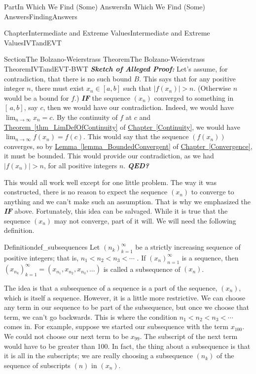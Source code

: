 \documentclass[oneside,10pt,]{book}
\newcommand{\xreffont}{\relax}
\newcommand{\alert}[1]{\textbf{\textit{#1}}}
\numberwithin{equation}{part}
\newcommand{\abs}[1]{\left|#1\right|}
\newcommand{\lt}{<}
\begin{document}
\begin{partptx}{Part}{In Which We Find (Some) Answers}{}{In Which We Find (Some) Answers}{}{}{FindingAnswers}
\begin{chapterptx}{Chapter}{Intermediate and Extreme Values}{}{Intermediate and Extreme Values}{}{}{IVTandEVT}
\begin{sectionptx}{Section}{The Bolzano-Weierstrass Theorem}{}{The Bolzano-Weierstrass Theorem}{}{}{IVTandEVT-BWT}
\alert{Sketch of Alleged Proof:} Let's assume, for contradiction, that there is no such bound \(B\). This says that for any positive integer \(n\), there must exist \(x_n\in[a,b]\) such that \(\abs{f(x_n)}>n\). (Otherwise \(n\) would be a bound for \(f\).) \alert{IF} the sequence \(\left(x_n\right)\) converged to something in \([\,a,b]\), say \(c\), then we would have our contradiction. Indeed, we would have \(\lim_{n\rightarrow\infty}x_n=c\). By the continuity of \(f\) at \(c\) and \hyperref[thm_LimDefOfContinuity]{Theorem~{\xreffont\ref{thm_LimDefOfContinuity}}} of \hyperref[Continuity]{Chapter~{\xreffont\ref{Continuity}}}, we would have \(\lim_{n\rightarrow\infty}f(x_n)=f(c)\). This would say that the sequence \(\left(f(x_n)\right)\) converges, so by \hyperref[lemma_BoundedConvergent]{Lemma~{\xreffont\ref{lemma_BoundedConvergent}}} of \hyperref[Convergence]{Chapter~{\xreffont\ref{Convergence}}}, it must be bounded. This would provide our contradiction, as we had \(|f(x_n)|>n\), for all positive integers \(n\). \alert{QED?}%
\par
This would all work well except for one little problem. The way it was constructed, there is no reason to expect the sequence \(\left(x_n\right)\) to converge to anything and we can't make such an assumption. That is why we emphasized the \alert{IF} above. Fortunately, this idea can be salvaged. While it is true that the sequence \(\left(x_n\right)\) may not converge, part of it will. We will need the following definition.%
\begin{definition}{Definition}{}{def_subsequences}%
 Let \(\left(n_k\right)_{k=1}^\infty\) be a strictly increasing sequence of positive integers; that is, \(n_1\lt n_2\lt n_3\lt \cdots\) . If \(\left(x_n\right)_{n=1}^\infty\) is a sequence, then \(\left(x_{n_k}\right)_{k=1}^\infty=\left(x_{n_1},x_{n_2},x_{n_3},\ldots \right)\) is called a subsequence of \(\left(x_n\right)\).%
\end{definition}
The idea is that a subsequence of a sequence is a part of the sequence, \((x_n)\), which is itself a sequence. However, it is a little more restrictive. We can choose any term in our sequence to be part of the subsequence, but once we choose that term, we can't go backwards. This is where the condition \(n_1\lt n_2\lt n_3\lt \cdots\) comes in. For example, suppose we started our subsequence with the term \(x_{100}\). We could not choose our next term to be \(x_{99}\). The subscript of the next term would have to be greater than 100. In fact, the thing about a subsequence is that it is all in the subscripts; we are really choosing a subsequence \(\left(n_k\right)\) of the sequence of subscripts \(\left(n\right)\) in \(\left(x_n\right)\).%

\end{sectionptx}
\end{chapterptx}
\end{partptx}
\end{document}
